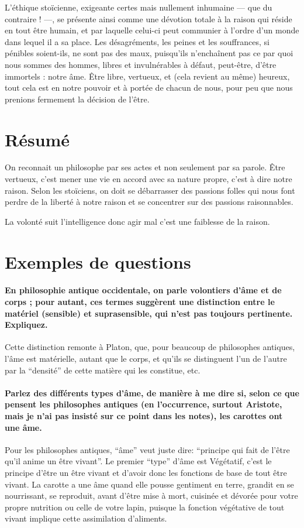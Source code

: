 L'éthique stoïcienne, exigeante certes mais nullement inhumaine --- que du contraire ! ---, se
présente ainsi comme une dévotion totale à la raison qui réside en tout être humain, et par
laquelle celui-ci peut communier à l'ordre d'un monde dans lequel il a sa place. Les désagréments, les peines et les souffrances, si pénibles soient-ils, ne sont pas des maux,
puisqu'ils n'enchaînent pas ce par quoi nous sommes des hommes, libres et invulnérables
à défaut, peut-être, d'être immortels : notre âme. Être libre, vertueux, et (cela revient au
même) heureux, tout cela est en notre pouvoir et à portée de chacun de nous, pour peu que
nous prenions fermement la décision de l'être.

\section{Résumé}
On reconnait un philosophe par ses actes et non seulement par sa parole.
Être vertueux, c'est mener une vie en accord avec sa nature propre, c'est à dire notre raison.
Selon les stoïciens, on doit se débarrasser des passions folles qui nous font perdre de la liberté à notre raison
et se concentrer sur des passions raisonnables.

La volonté suit l'intelligence donc agir mal c'est une faiblesse de la raison.

\section{Exemples de questions}
\paragraph{En philosophie antique occidentale, on parle volontiers d'âme et de corps ; pour autant, ces termes suggèrent une distinction entre le matériel (sensible) et suprasensible, qui n'est pas toujours pertinente. Expliquez.}
Cette distinction remonte à Platon, que, pour beaucoup de philosophes antiques, l'âme est matérielle, autant que le corps, et qu'ils se distinguent l'un de l'autre par la ``densité'' de cette matière qui les constitue, etc.

\paragraph{Parlez des différents types d'âme, de manière à me dire si, selon ce que pensent les philosophes antiques (en l'occurrence, surtout Aristote, mais je n'ai pas insisté sur ce point dans les notes), les carottes ont une âme.}
Pour les philosophes antiques, ``âme'' veut juste dire: ``principe qui fait de l'être qu'il anime un être vivant''.
Le premier ``type'' d'âme est Végétatif, c'est le principe d'être un être vivant et d'avoir donc les fonctions de base de tout être vivant.
La carotte a une âme quand elle pousse gentiment en terre, grandit en se nourrissant, se reproduit,
avant d'être mise à mort,
cuisinée et dévorée pour votre propre nutrition ou celle de votre lapin,
puisque la fonction végétative de tout vivant implique cette assimilation d'aliments.

